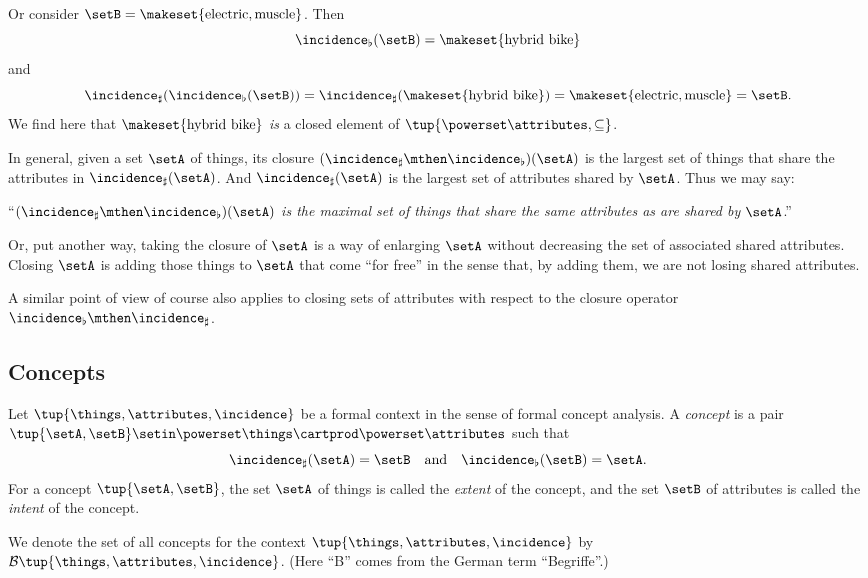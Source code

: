 Or consider $\setB = \makeset{\text{electric}, \text{muscle}}$. Then
\begin{equation}
\incidence_\flat(\setB) = \makeset{\text{hybrid bike}}
\end{equation}
and 
\begin{equation}
\incidence_\sharp(\incidence_\flat(\setB)) = \incidence_\sharp(\makeset{\text{hybrid bike}}) = \makeset{\text{electric}, \text{muscle}} = \setB.
\end{equation}
We find here that $\makeset{\text{hybrid bike}}$ \emph{is} a closed element of $\tup{\powerset \attributes, \subseteq}$. 

In general, given a set $\setA$ of things, its closure $(\incidence_\sharp \mthen \incidence_\flat)(\setA)$ is the largest set of things that share the attributes in $\incidence_\sharp(\setA)$. And $\incidence_\sharp(\setA)$ is the largest set of attributes shared by $\setA$. Thus we may say:

 ``\emph{$(\incidence_\sharp \mthen \incidence_\flat)(\setA)$ is the maximal set of things that share the same attributes as are shared by $\setA$}.'' 
 
Or, put another way, taking the closure of $\setA$ is a way of enlarging $\setA$ without decreasing the set of associated shared attributes. Closing $\setA$ is adding those things to $\setA$ that come ``for free'' in the sense that, by adding them, we are not losing shared attributes. 

A similar point of view of course also applies to closing sets of attributes with respect to the closure operator $\incidence_\flat \mthen \incidence_\sharp$.

\subsection{Concepts}

\begin{definition}\label{def:cfa-concept}
Let $\tup{\things, \attributes, \incidence}$ be a formal context in the sense of formal concept analysis. A \emph{concept} is a pair $\tup{\setA, \setB} \setin \powerset\things \cartprod \powerset\attributes$ such that 
\begin{equation}\label{eq:def-concept-equations}
\incidence_\sharp(\setA) = \setB \quad \text{and} \quad \incidence_\flat(\setB) = \setA.
\end{equation}
For a concept $\tup{\setA, \setB}$, the set $\setA$ of things is called the \emph{extent} of the concept, and the set $\setB$ of attributes is called the \emph{intent} of the concept. 

We denote the set of all concepts for the context $\tup{\things, \attributes, \incidence}$ by $\mathcal{B}\tup{\things, \attributes, \incidence}$. (Here ``B'' comes from the German term ``Begriffe''.) 
\end{definition}

